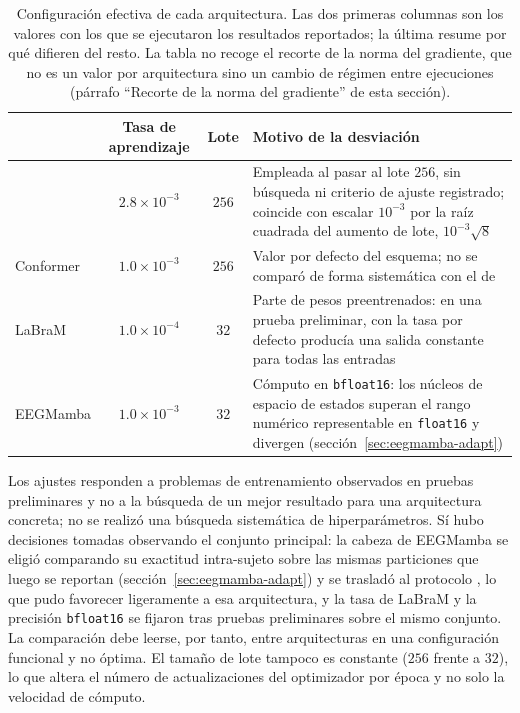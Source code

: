 \begin{table}[H]
\centering
\caption{Configuración efectiva de cada arquitectura. Las dos primeras columnas son los
valores con los que se ejecutaron los resultados reportados; la última resume por qué
difieren del resto. La tabla no recoge el recorte de la norma del gradiente, que no es un
valor por arquitectura sino un cambio de régimen entre ejecuciones (párrafo
``Recorte de la norma del gradiente'' de esta sección).}
\label{tab:configs}
\small
\begin{tabular}{lccp{7.2cm}}
\toprule
 & \textbf{Tasa de aprendizaje} & \textbf{Lote} & \textbf{Motivo de la desviación} \\
\midrule
\eegnet{}   & $2.8\times10^{-3}$ & $256$ & Empleada al pasar al lote $256$, sin búsqueda ni criterio de ajuste registrado; coincide con escalar $10^{-3}$ por la raíz cuadrada del aumento de lote, $10^{-3}\sqrt{8}$ \\
Conformer   & $1.0\times10^{-3}$ & $256$ & Valor por defecto del esquema; no se comparó de forma sistemática con el de \eegnet{} \\
LaBraM      & $1.0\times10^{-4}$ & $32$  & Parte de pesos preentrenados: en una prueba preliminar, con la tasa por defecto producía una salida constante para todas las entradas \\
EEGMamba    & $1.0\times10^{-3}$ & $32$  & Cómputo en \texttt{bfloat16}: los núcleos de espacio de estados superan el rango numérico representable en \texttt{float16} y divergen (sección~\ref{sec:eegmamba-adapt}) \\
\bottomrule
\end{tabular}
\end{table}

Los ajustes responden a problemas de entrenamiento observados en pruebas preliminares y no
a la búsqueda de un mejor resultado para una arquitectura concreta; no se realizó una
búsqueda sistemática de hiperparámetros. Sí hubo decisiones tomadas observando el conjunto
principal: la cabeza de EEGMamba se eligió comparando su exactitud intra-sujeto sobre las
mismas particiones que luego se reportan (sección~\ref{sec:eegmamba-adapt}) y se trasladó al
protocolo \loso{}, lo que pudo favorecer ligeramente a esa arquitectura, y la tasa de LaBraM
y la precisión \texttt{bfloat16} se fijaron tras pruebas preliminares sobre el mismo
conjunto. La comparación debe leerse, por tanto, entre arquitecturas en una configuración
funcional y no óptima. El tamaño de lote tampoco es constante ($256$ frente a $32$), lo que
altera el número de actualizaciones del optimizador por época y no solo la velocidad de
cómputo.


